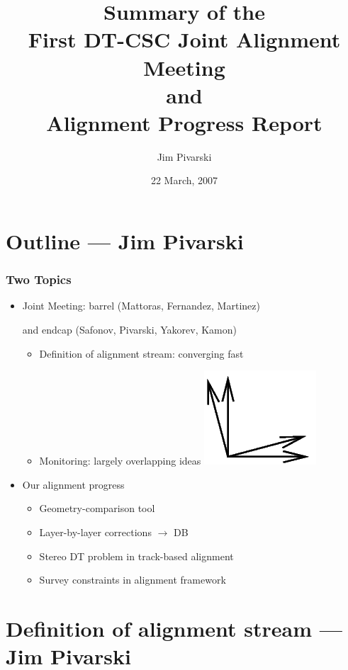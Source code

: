\documentclass[compress]{beamer}
\title{Summary of the \\ First DT-CSC Joint Alignment Meeting \\ and \\ Alignment Progress Report}
\author{Jim Pivarski}
\institute{Texas A\&M University}
\date{22 March, 2007}
\begin{document}
\frame{\titlepage}
\section*{Outline --- Jim Pivarski}

\begin{frame}
\frametitle{Two Topics}

\begin{itemize}\setlength{\itemsep}{0.5 cm}
\item Joint Meeting: barrel (Mattoras, Fernandez, Martinez)

\vspace{0.125 cm}
 and endcap (Safonov, Pivarski, Yakorev, Kamon)

\vspace{0.125 cm}
\begin{itemize}\setlength{\itemsep}{0.125 cm}
\item Definition of alignment stream: converging fast
\item Monitoring: largely overlapping ideas \includegraphics[width=0.5 cm]{overlap.png}
\end{itemize}

\item Our alignment progress

\vspace{0.125 cm}
\begin{itemize}\setlength{\itemsep}{0.125 cm}
\item Geometry-comparison tool
\item Layer-by-layer corrections $\to$ DB
\item Stereo DT problem in track-based alignment
\item Survey constraints in alignment framework
\end{itemize}
\end{itemize}
\vfill
\end{frame}

\section*{Definition of alignment stream --- Jim Pivarski}
\end{document}
